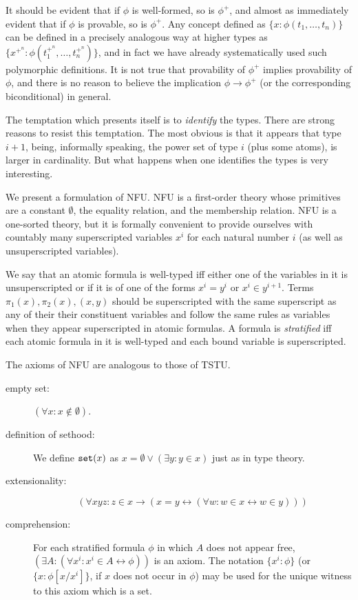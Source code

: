 \documentclass[12pt]{article}
\begin{document}
It should be evident that if $\phi$ is well-formed, so is $\phi^+$, and almost as immediately evident that if $\phi$ is provable, so is $\phi^+$.  Any concept defined as $\{x :\phi(t_1,\ldots,t_n)\}$ can
be defined in a precisely analogous way at higher types as $\{x^{+^n} :\phi(t_1^{+^n},\ldots ,t_n^{+^n})\}$, and in fact we have already systematically used such polymorphic definitions.  It is not
true that provability of $\phi^+$ implies provability of $\phi$, and there is no reason to believe the implication $\phi \rightarrow \phi^+$ (or the corresponding biconditional) in general.

The temptation which presents itself is to {\em identify\/} the types.  There are strong reasons to resist this temptation.  The most obvious is that it appears that type $i+1$, being, informally speaking,
the power set of type $i$ (plus some atoms), is larger in cardinality.  But what happens when one identifies the types is very interesting.

We present a formulation of NFU.  NFU is a first-order theory whose primitives are a constant $\emptyset$, the equality relation, and the membership relation.  NFU is a one-sorted theory, but it is formally convenient to provide ourselves with countably many superscripted variables $x^i$ for each natural number $i$ (as well as unsuperscripted variables).  

We say that an atomic formula is well-typed iff either one of the variables in it is unsuperscripted or if it is of one of the forms $x^i=y^i$ or $x^i \in y^{i+1}$.   Terms $\pi_1(x), \pi_2(x), (x,y)$ should
be superscripted with the same superscript as any of their their constituent variables and follow the same rules as variables when they appear superscripted in atomic formulas.  A formula is
{\em stratified\/} iff each atomic formula in it is well-typed and each bound variable is superscripted.

The axioms of NFU are analogous to those of TSTU.

\begin{description}

\item[empty set:]  $(\forall x:x \not\in \emptyset)$.

\item[definition of sethood:]  We define ${\tt set}(x)$ as $x = \emptyset \vee (\exists y:y \in x)$ just as in type theory.

\item[extensionality:]  $$(\forall xyz: z \in x \rightarrow (x=y \leftrightarrow (\forall w:w \in x \leftrightarrow w \in y)))$$

\item[comprehension:]  For each stratified formula $\phi$ in which $A$ does not appear free, $(\exists A:(\forall x^i:x^i \in A \leftrightarrow \phi))$ is an axiom.  The notation $\{x^i:\phi\}$ (or $\{x:\phi[x/x^i]\}$, if $x$ does not occur in $\phi$) may be used for the unique witness to this axiom which is a set.

\end{description}
\end{document}
